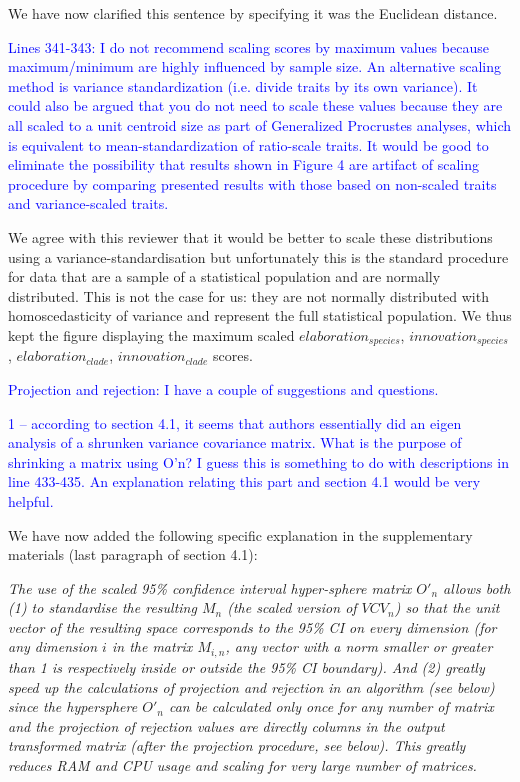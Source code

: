 \documentclass[12pt,letterpaper]{article}
\begin{document}
{We have now clarified this sentence by specifying it was the Euclidean distance.

\textcolor{blue}{Lines 341-343: I do not recommend scaling scores by maximum values because maximum/minimum are highly influenced by sample size. An alternative scaling method is variance standardization (i.e. divide traits by its own variance). It could also be argued that you do not need to scale these values because they are all scaled to a unit centroid size as part of Generalized Procrustes analyses, which is equivalent to mean-standardization of ratio-scale traits. It would be good to eliminate the possibility that results shown in Figure 4 are artifact of scaling procedure by comparing presented results with those based on non-scaled traits and variance-scaled traits.}

We agree with this reviewer that it would be better to scale these distributions using a variance-standardisation but unfortunately this is the standard procedure for data that are a sample of a statistical population and are normally distributed. This is not the case for us: they are not normally distributed with homoscedasticity of variance and represent the full statistical population. We thus kept the figure displaying the maximum scaled $elaboration_{species}$, $innovation_{species}$, $elaboration_{clade}$, $innovation_{clade}$ scores.


\textcolor{blue}{Projection and rejection: I have a couple of suggestions and questions.}

\textcolor{blue}{1 – according to section 4.1, it seems that authors essentially did an eigen analysis of a shrunken variance covariance matrix. What is the purpose of shrinking a matrix using O’n? I guess this is something to do with descriptions in line 433-435. An explanation relating this part and section 4.1 would be very helpful.}

We have now added the following specific explanation in the supplementary materials (last paragraph of section 4.1):

\noindent\textit{The use of the scaled 95\% confidence interval hyper-sphere matrix $O'_{n}$ allows both (1) to standardise the resulting $M_{n}$ (the scaled version of $VCV_{n}$) so that the unit vector of the resulting space corresponds to the 95\% CI on every dimension (for any dimension $i$ in the matrix $M_{i,n}$, any vector with a norm smaller or greater than 1 is respectively inside or outside the 95\% CI boundary). And (2) greatly speed up the calculations of projection and rejection in an algorithm (see below) since the hypersphere $O'_{n}$ can be calculated only once for any number of matrix and the projection of rejection values are directly columns in the output transformed matrix (after the projection procedure, see below). This greatly reduces RAM and CPU usage and scaling for very large number of matrices.}

}
\end{document}
